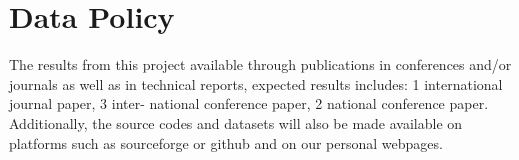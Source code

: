 \section{Data Policy}
\label{sec:data-policy}



The results from this project available through publications in conferences and/or journals as well as in technical reports, expected results includes: 1 international journal paper, 3 inter-
national conference paper, 2 national conference paper.
Additionally, the source codes and datasets will also be made available on platforms such as sourceforge or github and on our personal webpages. 